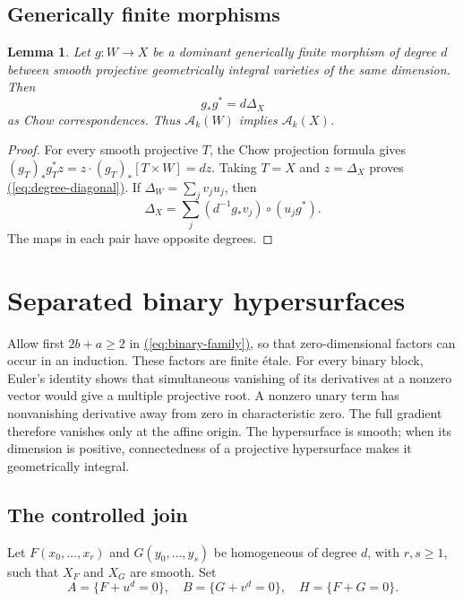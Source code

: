 \documentclass[11pt,a4paper]{article}
\newtheorem{lemma}[theorem]{Lemma}
\theoremstyle{definition}
\theoremstyle{remark}\newtheorem{remark}[theorem]{Remark}
\numberwithin{equation}{section}
\renewcommand{\eqref}[1]{\hyperref[#1]{\textcolor{equationlink}{(\ref*{#1})}}}
\begin{document}
\subsection{Generically finite morphisms}

\begin{lemma}\label{lem:degree}
Let $g:W\to X$ be a dominant generically finite morphism of degree
$d$ between smooth projective geometrically integral varieties of
the same dimension. Then
\begin{equation}\label{eq:degree-diagonal}
                       g_*g^*=d\Delta_X
\end{equation}
as Chow correspondences. Thus $\mathcal A_k(W)$ implies
$\mathcal A_k(X)$.
\end{lemma}

\begin{proof}
For every smooth projective $T$, the Chow projection formula gives
$(g_T)_*g_T^*z=z\cdot(g_T)_*[T\times W]=dz$.
Taking $T=X$ and $z=\Delta_X$ proves \eqref{eq:degree-diagonal}.
If $\Delta_W=\sum_jv_ju_j$, then
\begin{equation}\label{eq:degree-maps}
             \Delta_X=\sum_j(d^{-1}g_*v_j)\circ(u_jg^*).
\end{equation}
The maps in each pair have opposite degrees.
\end{proof}

\section{Separated binary hypersurfaces}\label{sec:binary}

Allow first $2b+a\ge2$ in \eqref{eq:binary-family}, so that
zero-dimensional factors can occur in an induction. These factors
are finite \'etale. For every binary block, Euler's identity
shows that simultaneous vanishing of its derivatives at a nonzero
vector would give a multiple projective root. A nonzero unary
term has nonvanishing derivative away from zero in characteristic
zero. The full gradient therefore vanishes only at the affine
origin. The hypersurface is smooth; when its dimension is positive,
connectedness of a projective hypersurface makes it geometrically
integral.

\subsection{The controlled join}

Let $F(x_0,\ldots,x_r)$ and $G(y_0,\ldots,y_s)$ be homogeneous of
degree $d$, with $r,s\ge1$, such that $X_F$ and $X_G$ are smooth.
Set
\[
 A=\{F+u^d=0\},\quad B=\{G+v^d=0\},\quad H=\{F+G=0\}.
\]
\end{document}
